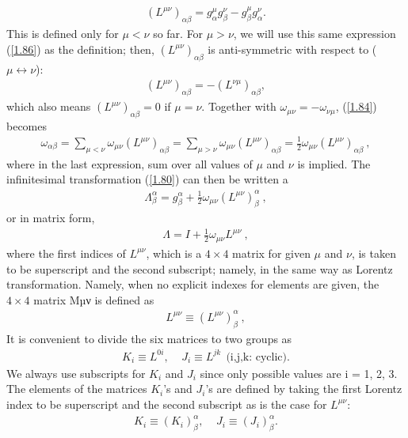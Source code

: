 \documentclass[12pt,a4paper]{report}
\begin{document}
\begin{align}
   (L^{\mu\nu})_{\alpha\beta}=g^\mu_\alpha g^\nu_\beta-g^\mu_\beta g^\nu_\alpha .\label{1.86}
\end{align}
This is defined only for $\mu < \nu$ so far. For $\mu > \nu$, we will use this same expression (\eqref{1.86}) as the definition; then, $(L^{\mu\nu})_{\alpha\beta}$ is anti-symmetric with respect to ($\mu\longleftrightarrow\nu$):
\begin{align}
    (L^{\mu\nu})_{\alpha\beta}=-(L^{\nu\mu})_{\alpha\beta},
\end{align}
which also means $(L^{\mu\nu})_{\alpha\beta} = 0$ if $\mu=\nu$. Together with $\omega_{\mu\nu}=-\omega_{\nu\mu}$, (\eqref{1.84}) becomes
\begin{align}
    \omega_{\alpha\beta}=\sum_{\mu<\nu}\omega_{\mu\nu}(L^{\mu\nu})_{\alpha\beta}=\sum_{\mu>\nu}\omega_{\mu\nu}(L^{\mu\nu})_{\alpha\beta}=\frac{1}{2}\omega_{\mu\nu}(L^{\mu\nu})_{\alpha\beta}~,
\end{align}
where in the last expression, sum over all values of $\mu$ and $\nu$ is implied. The infinitesimal transformation (\eqref{1.80}) can then be written a
\begin{align}
    \Lambda^\alpha_\beta=g^\alpha_\beta+\frac{1}{2}\omega_{\mu\nu}(L^{\mu\nu})^\alpha_\beta~,
\end{align}
or in matrix form,
\begin{align}
    \Lambda=I+\frac{1}{2}\omega_{\mu\nu}L^{\mu\nu}~,
\end{align}
where the first indices of $L^{\mu\nu}$, which is a $4 \times4$ matrix for given $\mu$ and $\nu$, is taken to be superscript and the second subscript; namely, in the same way as Lorentz transformation. Namely, when no explicit indexes for elements are given, the $4 \times 4$ matrix Mµν is defined as
\begin{align}
    L^{\mu\nu}\equiv(L^{\mu\nu})^\alpha_\beta~,
\end{align}
It is convenient to divide the six matrices to two groups as
\begin{align}
    K_i\equiv L^{0i},~~~~~J_i\equiv L^{jk}~~\text{(i,j,k: cyclic)}.
\end{align}
We always use subscripts for $K_i$ and $J_i$ since only possible values are i = 1, 2, 3. The elements of the matrices $K_i$’s and $J_i$’s are defined by taking the first Lorentz index to be superscript and the second subscript as is the case for $L^{\mu\nu}$:
\begin{align}
    K_i\equiv (K_i)^\alpha_\beta,~~~~~J_i\equiv(J_i)^\alpha_\beta.
\end{align}
\end{document}
